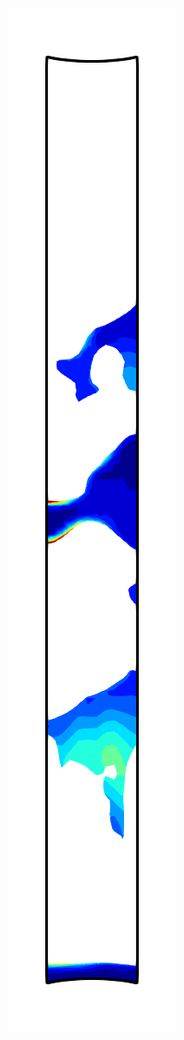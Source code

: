 \begin{figure}[!htb]
\begin{subfigure}{0.08\textwidth}
  \end{subfigure}
  \begin{subfigure}{0.08\textwidth}
    \centering
    \includegraphics[width=\textwidth]{Chapter5/figures/spallation/psii_7}

\end{subfigure}
\end{figure}
